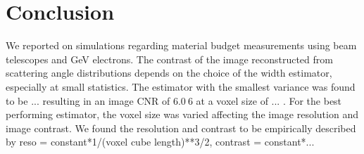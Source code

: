 \documentclass{PoS}
\begin{document}
\section{Conclusion}

We reported on simulations regarding material budget measurements using beam telescopes and GeV electrons. 
The contrast of the image reconstructed from scattering angle distributions depends on the choice of the width estimator, especially at small statistics. 
The estimator with the smallest variance was found to be ... resulting in an image CNR of $\SI{6.0}{6}$  at a voxel size of ... . %
For the best performing estimator, the voxel size was varied affecting the image resolution and image contrast. 
We found the resolution and contrast to be empirically described by reso = constant*1/(voxel cube length)**3/2, contrast = constant*...






\end{document}
